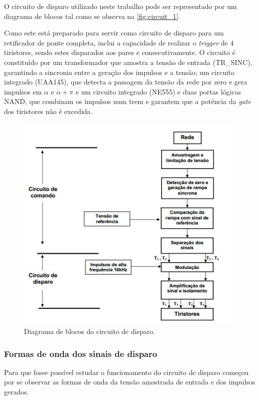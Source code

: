 \documentclass[a4paper,11pt]{article}
\numberwithin{equation}{section}
\begin{document}
O circuito de disparo utilizado neste trabalho pode ser representado por um diagrama de blocos tal como se observa na \autoref{fig:circuit_1}.

Como este está preparado para servir como circuito de disparo para um retificador de ponte completa, inclui a capacidade de realizar o \textit{trigger} de 4 tiristores, sendo estes disparados aos pares e consecutivamente. O circuito é constituído por um transformador que amostra a tensão de entrada (TR\_SINC), garantindo a sincronia entre a geração dos impulsos e a tensão; um circuito integrado (UAA145), que detecta a passagem da tensão da rede por zero e gera impulsos em $\alpha$ e $\alpha + \pi$ e um circuito integrado (NE555) e duas portas lógicas NAND, que combinam os impulsos num trem e garantem que a potência da \textit{gate} dos tiristores não é excedida.

\begin{figure}[h]
	\centering
	\includegraphics[keepaspectratio=true, scale=0.8]{teoricas/circuito_disparo}
	\caption{Diagrama de blocos do circuito de disparo.}
	\label{fig:circuit_1}
	\vspace{-0.8em}
\end{figure}

\subsubsection{Formas de onda dos sinais de disparo}

Para que fosse possível estudar o funcionamento do circuito de disparo começou por se observar as formas de onda da tensão amostrada de entrada e dos impulsos gerados.
\end{document}
